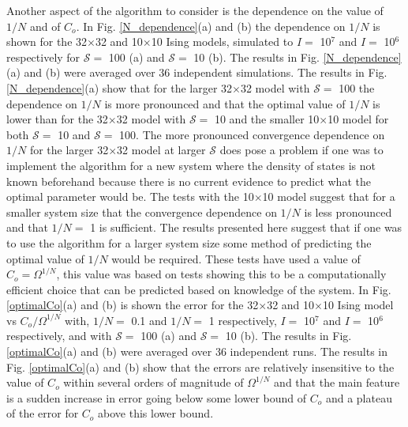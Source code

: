 \documentclass[aps,pre,reprint,superscriptaddress,showkeys]{revtex4-2}
\begin{document}
Another aspect of the algorithm to consider is the dependence on the value of $1/N$ and of $C_{o}$. In Fig. \ref{N_dependence}(a) and (b) the dependence on $1/N$ is shown for  the 32$\times$32  and  10$\times$10 Ising models, simulated to $I=$ 10$^7$ and $I=$ 10$^6$ respectively for $\mathcal{S}=$ 100  (a) and $\mathcal{S}=$ 10  (b). The results in Fig. \ref{N_dependence}(a) and (b) were averaged over 36 independent simulations. The results in Fig. \ref{N_dependence}(a) show that for the larger 32$\times$32 model with $\mathcal{S}=$ 100 the dependence on $1/N$ is more pronounced and that the optimal value of $1/N$ is lower than for the  32$\times$32 model with $\mathcal{S}=$ 10 and the  smaller 10$\times$10 model for both $\mathcal{S}=$ 10 and $\mathcal{S}=$ 100. The more pronounced convergence dependence on $1/N$ for the larger 32$\times$32 model at larger $\mathcal{S}$ does pose a problem if one was to implement the  algorithm for a new system where the density of states is not known beforehand because there is no current evidence to predict what the optimal parameter would be.  The tests with the 10$\times$10 model suggest that for a smaller system size that the convergence dependence on $1/N$ is less pronounced and that $1/N=$ 1 is sufficient. The results presented here suggest that if one was to use the algorithm for a larger system size some method of predicting the optimal value of $1/N$ would be required. These tests have used a value of $C_{o}=\Omega^{1/N}$, this value was based on tests showing this to be a computationally efficient choice that can be predicted based on knowledge of the system. In Fig. \ref{optimalCo}(a) and (b)  is shown the error for the 32$\times$32 and 10$\times$10   Ising model vs $C_{o}/\Omega^{1/N}$ with, $1/N=$ 0.1 and $1/N=$ 1 respectively, $I=$ 10$^7$ and $I=$ 10$^6$ respectively, and with $\mathcal{S}=$ 100  (a) and $\mathcal{S}=$ 10  (b). The results in Fig. \ref{optimalCo}(a) and (b) were averaged over 36 independent runs. The results in Fig. \ref{optimalCo}(a) and (b)  show that the errors are relatively insensitive to the value of $C_{o}$ within several orders of magnitude of $\Omega^{1/N}$ and that the main feature is a sudden increase in error going below some lower bound of $C_{o}$ and a plateau of the error for $C_{o}$ above this lower bound. 
\end{document}
